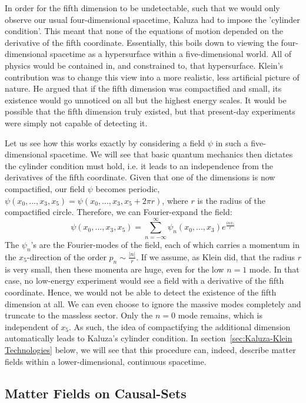 \documentclass[a4paper,12pt]{article}
\numberwithin{equation}{section}
\begin{document}
In order for the fifth dimension to be undetectable, such that we would only observe our usual four-dimensional spacetime, Kaluza had to impose the 'cylinder condition'. This meant that none of the equations of motion depended on the derivative of the fifth coordinate. Essentially, this boils down to viewing the four-dimensional spacetime as a hypersurface within a five-dimensional world. All of physics would be contained in, and constrained to, that hypersurface. Klein's contribution was to change this view into a more realistic, less artificial picture of nature. He argued that if the fifth dimension was compactified and small, its existence would go unnoticed on all but the highest energy scales. It would be possible that the fifth dimension truly existed, but that present-day experiments were simply not capable of detecting it.

Let us see how this works exactly by considering a field $\psi$ in such a five-dimensional spacetime. We will see that basic quantum mechanics then dictates the cylinder condition must hold, i.e. it leads to an independence from the derivatives of the fifth coordinate. Given that one of the dimensions is now compactified, our field $\psi$ becomes periodic, $\psi(x_0,...,x_3,x_5)=\psi(x_0,...,x_3,x_5+2 \pi r)$, where $r$ is the radius of the compactified circle. Therefore, we can Fourier-expand the field:
\begin{equation}
\label{eq:Fourier}
\psi(x_0,...,x_3,x_5)=\sum_{n=-\infty}^{\infty} \psi_{n}(x_0,...,x_3) e^{\frac{i n x_5}{r}}
\end{equation}
The $\psi_n$'s are the Fourier-modes of the field, each of which carries a momentum in the $x_5$-direction of the order $p_n \sim \frac{|n|}{r}$. If we assume, as Klein did, that the radius $r$ is very small, then these momenta are huge, even for the low $n=1$ mode. In that case, no low-energy experiment would see a field with a derivative of the fifth coordinate. Hence, we would not be able to detect the existence of the fifth dimension at all. We can even choose to ignore the massive modes completely and truncate to the massless sector. Only the $n=0$ mode remains, which is independent of $x_5$. As such, the idea of compactifying the additional dimension automatically leads to Kaluza's cylinder condition. In section~\ref{sec:Kaluza-Klein Technologies} below, we will see that this procedure can, indeed, describe matter fields within a lower-dimensional, continuous spacetime.


\subsection{Matter Fields on Causal-Sets}
\label{sec:Matter Fields on Causal-Sets}
\end{document}
